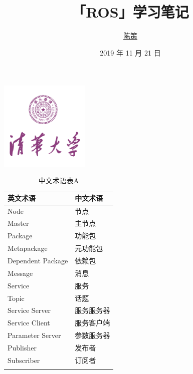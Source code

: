 \documentclass[geye,green,kindle,cn]{elegantnote}
\title{「ROS」学习笔记}
\author{\href{https://accelerator-blog.com}{陈策}}
\date{2019 年 11 月 21 日}
\begin{document}
\maketitle
\centerline{\includegraphics[width=0.32\textwidth]{src/TsinghuaLogo.pdf}}

\begin{table}[htbp]
    \centering
    \caption{中文术语表A} \label{table:ChineseTermTableA}
    \begin{tabular}{p{80pt}<{\centering}p{80pt}<{\centering}}
    \Xhline{1.0pt}
    \textbf{英文术语} & 
    \textbf{中文术语} \\
    \hline
    Node &
    节点 \\
    Master &
    主节点 \\
    Package &
    功能包 \\
    Metapackage &
    元功能包 \\
    Dependent Package &
    依赖包 \\
    Message &
    消息 \\
    Service &
    服务 \\
    Topic &
    话题 \\
    Service Server &
    服务服务器 \\
    Service Client &
    服务客户端 \\
    Parameter Server &
    参数服务器 \\
    Publisher &
    发布者 \\
    Subscriber &
    订阅者 \\
    \Xhline{1.0pt}
    \end{tabular}
\end{table}
\end{document}
